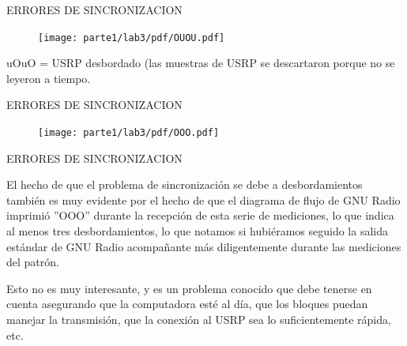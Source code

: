 \begin{frame}{ERRORES DE SINCRONIZACION}

\begin{figure}
\begin{center}
\vspace{-8mm}
\texttt{[image: parte1/lab3/pdf/OUOU.pdf]}
\end{center}
\end{figure}
\vspace{-5mm}

uOuO = USRP desbordado (las muestras de USRP se descartaron porque no se leyeron a tiempo.\\ \vspace{2mm}

\end{frame}
\begin{frame}{ERRORES DE SINCRONIZACION}

\begin{figure}
\begin{center}
\vspace{-8mm}
\texttt{[image: parte1/lab3/pdf/OOO.pdf]}
\end{center}
\end{figure}
\vspace{-5mm}


\end{frame}

\begin{frame}{ERRORES DE SINCRONIZACION}

El hecho de que el problema de sincronización se debe a desbordamientos también es muy evidente por el hecho de que el diagrama de flujo de GNU Radio imprimió ”OOO” durante la recepción de esta serie de mediciones, lo que indica al menos tres desbordamientos, lo que notamos si hubiéramos seguido la salida
estándar de GNU Radio acompañante más diligentemente durante las mediciones del patrón. \\ \vspace{2mm}

Esto no es muy interesante, y es un problema conocido que debe tenerse en cuenta asegurando que la computadora esté al día, que los bloques puedan manejar la transmisión, que la conexión al USRP sea lo suficientemente rápida, etc.\\ \vspace{2mm}

\end{frame}




